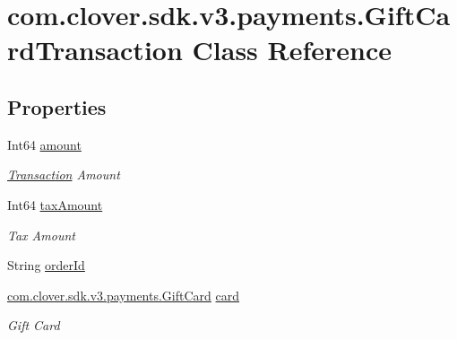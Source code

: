 \hypertarget{classcom_1_1clover_1_1sdk_1_1v3_1_1payments_1_1_gift_card_transaction}{}\section{com.\+clover.\+sdk.\+v3.\+payments.\+Gift\+Card\+Transaction Class Reference}
\label{classcom_1_1clover_1_1sdk_1_1v3_1_1payments_1_1_gift_card_transaction}
\subsection*{Properties}
\begin{DoxyCompactItemize}
\item 
Int64 \hyperlink{classcom_1_1clover_1_1sdk_1_1v3_1_1payments_1_1_gift_card_transaction_a07a718c4cacd36d8f4406c3b86e3db5a}{amount}
\begin{DoxyCompactList}\small\item\em \hyperlink{classcom_1_1clover_1_1sdk_1_1v3_1_1payments_1_1_transaction}{Transaction} Amount \end{DoxyCompactList}\item 
Int64 \hyperlink{classcom_1_1clover_1_1sdk_1_1v3_1_1payments_1_1_gift_card_transaction_a2c46346c29a55029673305b57344326d}{tax\+Amount}
\begin{DoxyCompactList}\small\item\em Tax Amount \end{DoxyCompactList}\item 
String \hyperlink{classcom_1_1clover_1_1sdk_1_1v3_1_1payments_1_1_gift_card_transaction_a71fe2c312e91eb57e3591de569152f88}{order\+Id}
\item 
\hyperlink{classcom_1_1clover_1_1sdk_1_1v3_1_1payments_1_1_gift_card}{com.\+clover.\+sdk.\+v3.\+payments.\+Gift\+Card} \hyperlink{classcom_1_1clover_1_1sdk_1_1v3_1_1payments_1_1_gift_card_transaction_a8671fb98a141ca628255548e99427a45}{card}
\begin{DoxyCompactList}\small\item\em Gift Card \end{DoxyCompactList}\item 

\end{DoxyCompactItemize}
